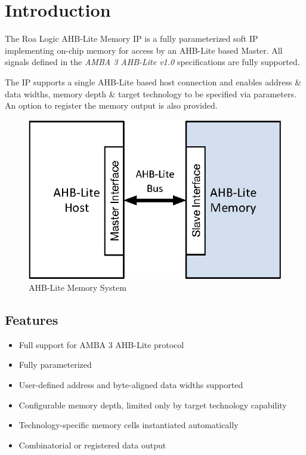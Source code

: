 \chapter{Introduction}\label{introduction}

The Roa Logic AHB-Lite Memory IP is a fully parameterized soft IP
implementing on-chip memory for access by an AHB-Lite based Master. 
All signals defined in the \emph{AMBA 3 AHB-Lite v1.0} specifications are
fully supported.

The IP supports a single AHB-Lite based host connection and enables
address \& data widths, memory depth \& target technology to be
specified via parameters. An option to register the memory output is
also provided.

\begin{figure}[th]
	\centering
	\includegraphics{assets/img/AHB-Lite-Memory-SysDiag}
	\caption{AHB-Lite Memory System}
	\label{fig:ahb-lite-memory-sysdiag}
\end{figure}

\section{Features}\label{features}

\begin{itemize}
\item
  Full support for AMBA 3 AHB-Lite protocol
\item
  Fully parameterized
\item
  User-defined address and byte-aligned data widths supported
\item
  Configurable memory depth, limited only by target technology
  capability
\item
  Technology-specific memory cells instantiated automatically
\item
  Combinatorial or registered data output
\end{itemize}